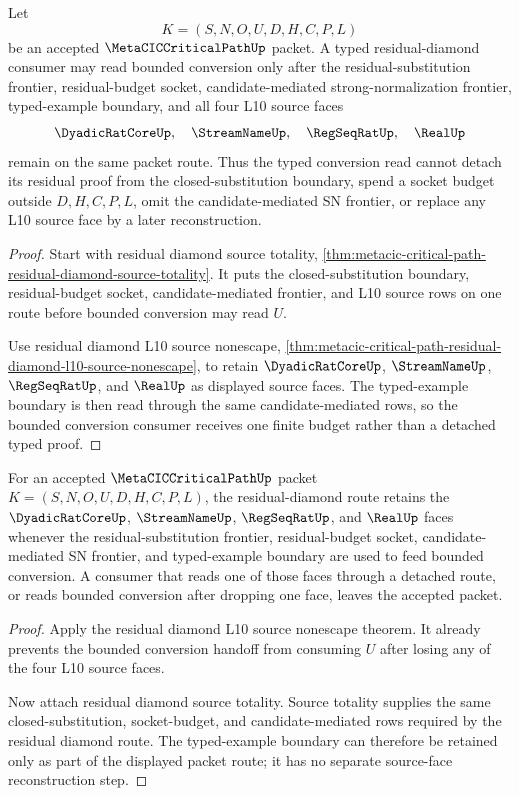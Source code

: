\begin{theorem}
\label{thm:metacic-critical-path-residual-diamond-typed-l10-budget}
Let
$$
K=(S,N,O,U,D,H,C,P,L)
$$
be an accepted $\MetaCICCriticalPathUp$ packet. A typed residual-diamond consumer may read bounded conversion only after the residual-substitution frontier, residual-budget socket, candidate-mediated strong-normalization frontier, typed-example boundary, and all four L10 source faces
$$
\DyadicRatCoreUp,\quad \StreamNameUp,\quad \RegSeqRatUp,\quad \RealUp
$$
remain on the same packet route. Thus the typed conversion read cannot detach its residual proof from the closed-substitution boundary, spend a socket budget outside $D,H,C,P,L$, omit the candidate-mediated SN frontier, or replace any L10 source face by a later reconstruction.
\end{theorem}
\begin{proof}
Start with residual diamond source totality, \autoref{thm:metacic-critical-path-residual-diamond-source-totality}. It puts the closed-substitution boundary, residual-budget socket, candidate-mediated frontier, and L10 source rows on one route before bounded conversion may read $U$.

Use residual diamond L10 source nonescape, \autoref{thm:metacic-critical-path-residual-diamond-l10-source-nonescape}, to retain $\DyadicRatCoreUp$, $\StreamNameUp$, $\RegSeqRatUp$, and $\RealUp$ as displayed source faces. The typed-example boundary is then read through the same candidate-mediated rows, so the bounded conversion consumer receives one finite budget rather than a detached typed proof.
\end{proof}

\begin{theorem}
\label{thm:metacic-critical-path-residual-diamond-source-face-retention}
For an accepted $\MetaCICCriticalPathUp$ packet $K=(S,N,O,U,D,H,C,P,L)$, the residual-diamond route retains the $\DyadicRatCoreUp$, $\StreamNameUp$, $\RegSeqRatUp$, and $\RealUp$ faces whenever the residual-substitution frontier, residual-budget socket, candidate-mediated SN frontier, and typed-example boundary are used to feed bounded conversion. A consumer that reads one of those faces through a detached route, or reads bounded conversion after dropping one face, leaves the accepted packet.
\end{theorem}
\begin{proof}
Apply the residual diamond L10 source nonescape theorem. It already prevents the bounded conversion handoff from consuming $U$ after losing any of the four L10 source faces.

Now attach residual diamond source totality. Source totality supplies the same closed-substitution, socket-budget, and candidate-mediated rows required by the residual diamond route. The typed-example boundary can therefore be retained only as part of the displayed packet route; it has no separate source-face reconstruction step.
\end{proof}

